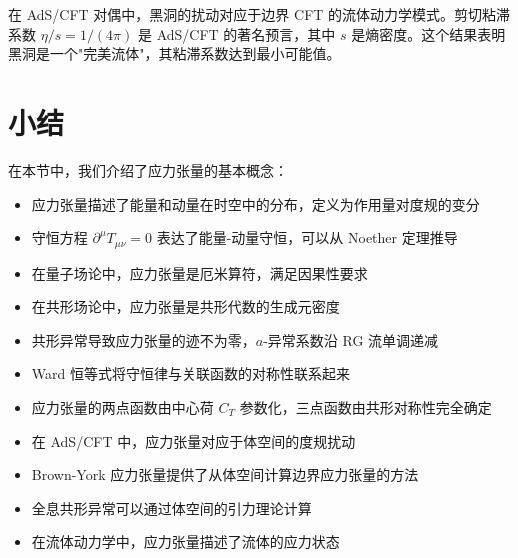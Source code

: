 \begin{remark}
在 AdS/CFT 对偶中，黑洞的扰动对应于边界 CFT 的流体动力学模式。剪切粘滞系数 $\eta/s = 1/(4\pi)$ 是 AdS/CFT 的著名预言，其中 $s$ 是熵密度。这个结果表明黑洞是一个"完美流体"，其粘滞系数达到最小可能值。
\end{remark}

\section{小结}

在本节中，我们介绍了应力张量的基本概念：
\begin{itemize}
    \item 应力张量描述了能量和动量在时空中的分布，定义为作用量对度规的变分
    \item 守恒方程 $\partial^\mu T_{\mu\nu} = 0$ 表达了能量-动量守恒，可以从 Noether 定理推导
    \item 在量子场论中，应力张量是厄米算符，满足因果性要求
    \item 在共形场论中，应力张量是共形代数的生成元密度
    \item 共形异常导致应力张量的迹不为零，$a$-异常系数沿 RG 流单调递减
    \item Ward 恒等式将守恒律与关联函数的对称性联系起来
    \item 应力张量的两点函数由中心荷 $C_T$ 参数化，三点函数由共形对称性完全确定
    \item 在 AdS/CFT 中，应力张量对应于体空间的度规扰动\cite{Balasubramanian1999}
    \item Brown-York 应力张量提供了从体空间计算边界应力张量的方法\cite{Brown1993}
    \item 全息共形异常可以通过体空间的引力理论计算\cite{Henningson1998}
    \item 在流体动力学中，应力张量描述了流体的应力状态
\end{itemize}

